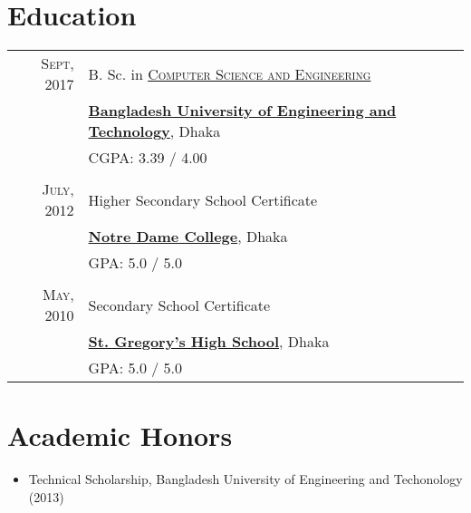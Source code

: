 \documentclass[a4paper,10pt]{article}
\begin{document}
\section{Education}
\begin{tabular}{rl} 
 \textsc{Sept}, 2017 & B. Sc. in \href{https://cse.buet.ac.bd/}{\textsc{Computer Science and Engineering}} \\
 & \href{http://www.buet.ac.bd/}{\textbf{Bangladesh University of Engineering and Technology}}, Dhaka \\
& \normalsize \textsc{CGPA}: 3.39 / 4.00 \\

&\\

\textsc{July}, 2012 & Higher Secondary School Certificate \\
 & \href{http://www.notredamecollege-dhaka.com/}{\textbf{Notre Dame College}}, Dhaka \\
 & \normalsize \textsc{GPA}: 5.0 / 5.0 \\
&\\

\textsc{May}, 2010 & Secondary School Certificate \\
 & \href{http://www.sghsbd.com/}{\textbf{St. Gregory's High School}}, Dhaka \\
 & \normalsize \textsc{GPA}: 5.0 / 5.0 

\end{tabular}

\begin{comment}
\section{Scholarships and Certificates}
\begin{tabular}{rl}
 \textsc{Sept.} 2006 & Scholarship for graduate students with an outstanding curriculum \footnotesize(\EURcr 30,000)\normalsize\\
\textsc{June} 2006 & {\textsc{Gmat}\textregistered}\setmainfont[SmallCapsFont=Fontin-SmallCaps.otf]{Fontin.otf}: 730 (\textsc{q:50;v:39}) 96\textsuperscript{th} percentile; \textsc{awa}: 6.0/6.0 (89\textsuperscript{th} percentile)
\end{tabular}
\end{comment}


\section{Academic Honors}
\begin{itemize}
    \item 
    Technical Scholarship, Bangladesh University of Engineering and Techonology (2013)

\end{itemize}
\end{document}
